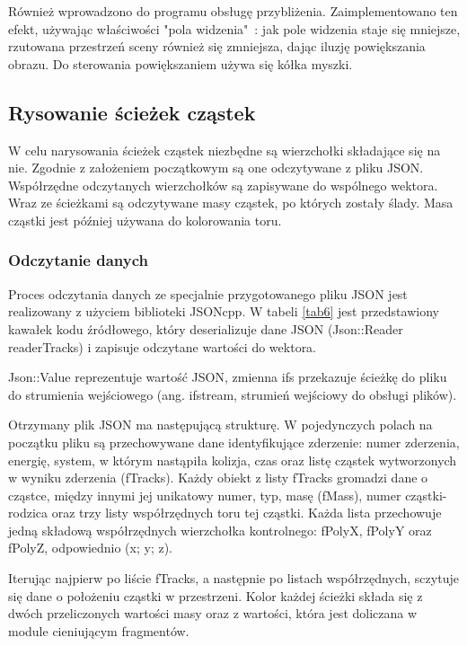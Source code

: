 Również wprowadzono do programu obsługę przybliżenia. Zaimplementowano ten efekt, używając właściwości "pola widzenia"\ : jak pole widzenia staje się mniejsze, rzutowana przestrzeń sceny również się zmniejsza, dając iluzję powiększania obrazu. Do sterowania powiększaniem używa się kółka myszki.

\subsection{Rysowanie ścieżek cząstek}
W celu narysowania ścieżek cząstek niezbędne są wierzchołki składające się na nie. Zgodnie z założeniem początkowym są one odczytywane z pliku JSON. Współrzędne odczytanych wierzchołków są zapisywane do wspólnego wektora. Wraz ze ścieżkami są odczytywane masy cząstek, po których zostały ślady. Masa cząstki jest później używana do kolorowania toru.

\subsubsection{Odczytanie danych}
Proces odczytania danych ze specjalnie przygotowanego pliku JSON jest realizowany z użyciem biblioteki JSONcpp. W tabeli \ref{tab6} jest przedstawiony kawałek kodu źródłowego, który deserializuje dane JSON (Json::Reader readerTracks) i zapisuje odczytane wartości do wektora.

Json::Value reprezentuje wartość JSON, zmienna ifs przekazuje ścieżkę do pliku do strumienia wejściowego (ang. ifstream, strumień wejściowy do obsługi plików).

Otrzymany plik JSON ma następującą strukturę. W pojedynczych polach na początku pliku są przechowywane dane identyfikujące zderzenie: numer zderzenia, energię, system, w którym nastąpiła kolizja, czas oraz listę cząstek wytworzonych w wyniku zderzenia (fTracks). Każdy obiekt z listy fTracks gromadzi dane o cząstce, między innymi jej unikatowy numer, typ, masę (fMass), numer cząstki-rodzica oraz trzy listy współrzędnych toru tej cząstki. Każda lista przechowuje jedną składową współrzędnych wierzchołka kontrolnego: fPolyX, fPolyY oraz fPolyZ, odpowiednio (x; y; z).

Iterując najpierw po liście fTracks, a następnie po listach współrzędnych, sczytuje się dane o położeniu cząstki w przestrzeni. Kolor każdej ścieżki składa się z dwóch przeliczonych wartości masy oraz z wartości, która jest doliczana w module cieniującym fragmentów.

